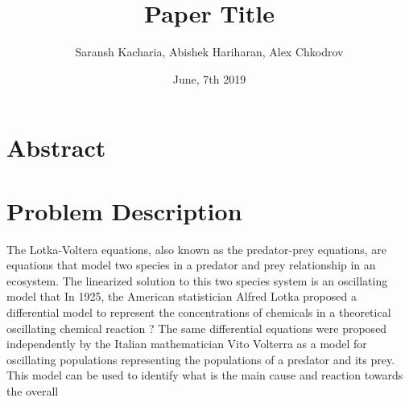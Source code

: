 \documentclass[11pt,oneside]{article}
\title{Paper Title}
\author{Saransh Kacharia, Abishek Hariharan, Alex Chkodrov}
\date{June, 7th 2019}
\begin{document}
\maketitle
\pagestyle{fancy}
\section{Abstract}
\section{Problem Description}
The Lotka-Voltera equations, also known as the predator-prey equations, are equations that model two species in a predator and prey relationship in an ecosystem. The linearized solution to this two species system is an oscillating model that 
In 1925, the American statistician Alfred Lotka proposed a differential model to represent the concentrations of chemicals in a theoretical oscillating chemical reaction ? The same differential equations were proposed independently by the Italian mathematician Vito Volterra as a model for oscillating populations representing the populations of a predator and its prey. This model can be used to identify what is the main cause and reaction towards the overall
\end{document}
